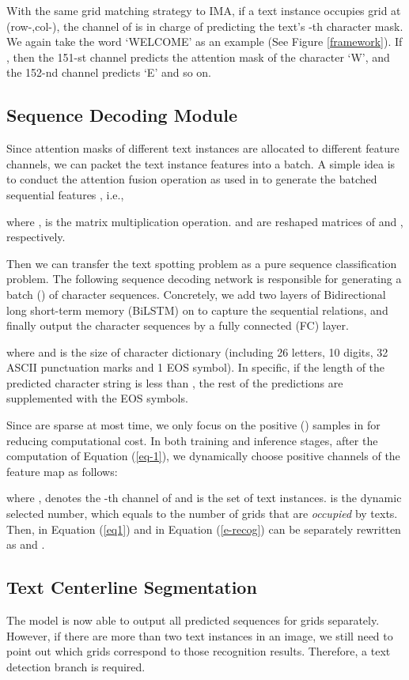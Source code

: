 \documentclass[letterpaper]{article} \usepackage{aaai21}  \usepackage{times}  \usepackage{helvet} \usepackage{courier}  \usepackage[hyphens]{url}  \usepackage{graphicx} \urlstyle{rm} \def\UrlFont{\rm}  \usepackage{natbib}  \usepackage{caption} \frenchspacing  \setlength{\pdfpagewidth}{8.5in}  \setlength{\pdfpageheight}{11in}  \usepackage{multirow}
\begin{document}
With the same grid matching strategy to IMA, if a text instance  occupies grid  at (row-,col-), the  channel of  is in charge of predicting the text's -th character mask.
We again take the word `WELCOME' as an example (See Figure  \ref{framework}).
If , then the 151-st  channel predicts the attention mask of the character `W', and the 152-nd channel predicts `E' and so on.


\subsection{Sequence Decoding Module}
Since attention masks of different text instances are allocated to different feature channels, we can packet the text instance features into a batch.
A simple idea is to conduct the attention fusion operation as used in \cite{wang2020decoupled} to generate the batched sequential features , i.e.,

where ,   is the matrix multiplication operation.  and  are reshaped matrices of  and , respectively.

Then we can transfer the text spotting problem as a pure sequence classification problem.
The following sequence decoding network is responsible for generating a batch () of character sequences.
Concretely, we add two layers of Bidirectional long short-term memory (BiLSTM) \cite{hochreiter1997long} on  to capture the sequential relations, and finally output the character sequences by a fully connected (FC) layer.

where  and  is the size of character dictionary (including 26 letters, 10 digits, 32 ASCII punctuation marks and 1 EOS symbol).
In specific, if the length of the predicted character string is less than , the rest of the predictions are supplemented with the EOS symbols.

Since  are sparse at most time, we only focus on the positive () samples in  for reducing computational cost. In both training and inference stages, after the computation of Equation (\ref{eq-1}), we dynamically choose positive channels of the feature map as follows:

where ,  denotes the -th channel of  and  is the set of text instances.  is the dynamic selected number, which equals to the number of grids that are \emph{occupied} by texts.
Then,  in Equation (\ref{eq1}) and  in Equation (\ref{e-recog}) can be separately rewritten as  and .


\subsection{Text Centerline Segmentation}
The model is now able to output all predicted sequences for  grids separately. However, if there are more than two text instances in an image, we still need to point out which grids correspond to those recognition results. Therefore, a text detection branch is required.
\end{document}
